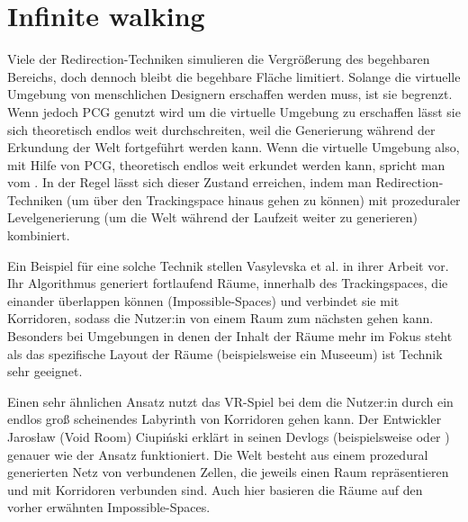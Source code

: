 \section{Infinite walking}
Viele der Redirection-Techniken simulieren die Vergrößerung des begehbaren Bereichs, doch dennoch bleibt die begehbare Fläche limitiert. Solange die virtuelle Umgebung von menschlichen Designern erschaffen werden muss, ist sie begrenzt. Wenn jedoch PCG genutzt wird um die virtuelle Umgebung zu erschaffen lässt sie sich theoretisch endlos weit durchschreiten, weil die Generierung während der Erkundung der Welt fortgeführt werden kann.
Wenn die virtuelle Umgebung also, mit Hilfe von PCG, theoretisch endlos weit erkundet werden kann, spricht man vom .
In der Regel lässt sich dieser Zustand %
erreichen, indem man Redirection-Techniken (um über den Trackingspace hinaus gehen zu können) mit prozeduraler Levelgenerierung (um die Welt während der Laufzeit weiter zu generieren) kombiniert.

Ein Beispiel für eine solche Technik stellen Vasylevska et al. in ihrer Arbeit \cite{flexible-spaces} vor. Ihr Algorithmus generiert fortlaufend Räume, innerhalb des Trackingspaces, die einander überlappen können (Impossible-Spaces) und verbindet sie mit Korridoren, sodass die Nutzer:in von einem Raum zum nächsten gehen kann.
Besonders bei Umgebungen in denen der Inhalt der Räume mehr im Fokus steht als das spezifische Layout der Räume (beispielsweise ein Museeum) ist Technik sehr geeignet.

Einen sehr ähnlichen Ansatz nutzt das VR-Spiel  \cite{tea-for-god} bei dem die Nutzer:in durch ein endlos groß scheinendes Labyrinth von Korridoren gehen kann. Der Entwickler Jarosław (Void Room) Ciupiński erklärt in seinen Devlogs (beispielsweise \cite{tea-for-god-devlog-a} oder \cite{tea-for-god-devlog-b}) genauer wie der Ansatz funktioniert.
Die Welt besteht aus einem prozedural generierten Netz von verbundenen Zellen, die jeweils einen Raum repräsentieren und mit Korridoren verbunden sind. Auch hier basieren die Räume auf den vorher erwähnten Impossible-Spaces.

